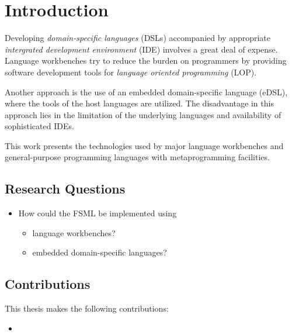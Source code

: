 \chapter{Introduction}

Developing \textit{domain-specific languages} (DSLs) accompanied by appropriate \textit{intergrated development environment} (IDE) involves a great deal of expense.
Language workbenches try to reduce the burden on programmers by providing software development tools for \textit{language oriented programming} (LOP).

Another approach is the use of an embedded domain-specific language (eDSL), where the tools of the host languages are utilized.
The disadvantage in this approach lies in the limitation of the underlying languages and availability of sophisticated IDEs.

This work presents the technologies used by major language workbenches and general-purpose programming languages with metaprogramming facilities.


\section{Research Questions}

\begin{itemize}
	\item How could the FSML be implemented using
	\begin{itemize}
		\item language workbenches?
		\item embedded domain-specific languages?
	\end{itemize}
\end{itemize}

\section{Contributions}

This thesis makes the following contributions:
\begin{itemize}
	\item 
\end{itemize}
